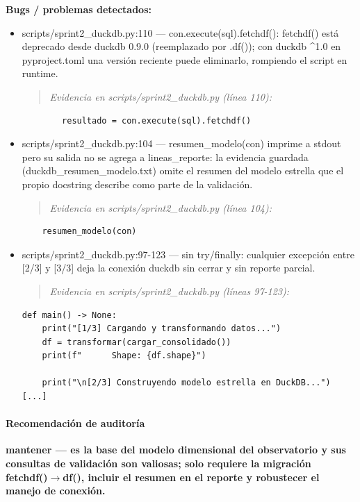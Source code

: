 \begin{tcolorbox}[riesgo]
\textbf{Bugs / problemas detectados:}
\begin{itemize}
  \item scripts/sprint2\_duckdb.py:110 --- con.execute(sql).fetchdf(): fetchdf() está deprecado desde duckdb 0.9.0 (reemplazado por .df()); con duckdb \textasciicircum{}1.0 en pyproject.toml una versión reciente puede eliminarlo, rompiendo el script en runtime.
\begin{quote}\footnotesize\ttfamily
\noindent\emph{Evidencia en scripts/sprint2\_duckdb.py (línea 110):}
\end{quote}
\begin{lstlisting}
        resultado = con.execute(sql).fetchdf()
\end{lstlisting}

  \item scripts/sprint2\_duckdb.py:104 --- resumen\_modelo(con) imprime a stdout pero su salida no se agrega a lineas\_reporte: la evidencia guardada (duckdb\_resumen\_modelo.txt) omite el resumen del modelo estrella que el propio docstring describe como parte de la validación.
\begin{quote}\footnotesize\ttfamily
\noindent\emph{Evidencia en scripts/sprint2\_duckdb.py (línea 104):}
\end{quote}
\begin{lstlisting}
    resumen_modelo(con)
\end{lstlisting}

  \item scripts/sprint2\_duckdb.py:97-123 --- sin try/finally: cualquier excepción entre [2/3] y [3/3] deja la conexión duckdb sin cerrar y sin reporte parcial.
\begin{quote}\footnotesize\ttfamily
\noindent\emph{Evidencia en scripts/sprint2\_duckdb.py (líneas 97-123):}
\end{quote}
\begin{lstlisting}
def main() -> None:
    print("[1/3] Cargando y transformando datos...")
    df = transformar(cargar_consolidado())
    print(f"      Shape: {df.shape}")

    print("\n[2/3] Construyendo modelo estrella en DuckDB...")
[...]
\end{lstlisting}

\end{itemize}
\end{tcolorbox}

\paragraph{Recomendación de auditoría}
\textbf{mantener --- es la base del modelo dimensional del observatorio y sus consultas de validación son valiosas; solo requiere la migración fetchdf()$\rightarrow$df(), incluir el resumen en el reporte y robustecer el manejo de conexión.}

